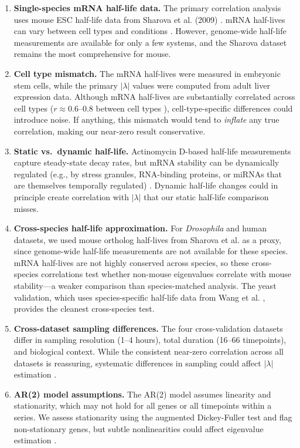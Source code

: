 \documentclass[11pt,letterpaper]{article}
\begin{document}
\begin{enumerate}
\item \textbf{Single-species mRNA half-life data.} The primary correlation analysis uses mouse ESC half-life data from Sharova et al. (2009) \citep{sharova2009database}. mRNA half-lives can vary between cell types and conditions \citep{schwanhausser2011global, tani2012identification}. However, genome-wide half-life measurements are available for only a few systems, and the Sharova dataset remains the most comprehensive for mouse.

\item \textbf{Cell type mismatch.} The mRNA half-lives were measured in embryonic stem cells, while the primary $|\lambda|$ values were computed from adult liver expression data. Although mRNA half-lives are substantially correlated across cell types ($r \approx 0.6$--$0.8$ between cell types \citep{schwanhausser2011global}), cell-type-specific differences could introduce noise. If anything, this mismatch would tend to \textit{inflate} any true correlation, making our near-zero result conservative.

\item \textbf{Static vs.\ dynamic half-life.} Actinomycin D-based half-life measurements capture steady-state decay rates, but mRNA stability can be dynamically regulated (e.g., by stress granules, RNA-binding proteins, or miRNAs that are themselves temporally regulated) \citep{anderson2009stress, keene2007rna}. Dynamic half-life changes could in principle create correlation with $|\lambda|$ that our static half-life comparison misses.

\item \textbf{Cross-species half-life approximation.} For \textit{Drosophila} and human datasets, we used mouse ortholog half-lives from Sharova et al. as a proxy, since genome-wide half-life measurements are not available for these species. mRNA half-lives are not highly conserved across species, so these cross-species correlations test whether non-mouse eigenvalues correlate with mouse stability---a weaker comparison than species-matched analysis. The yeast validation, which uses species-specific half-life data from Wang et al. \citep{wang2002precision}, provides the cleanest cross-species test.

\item \textbf{Cross-dataset sampling differences.} The four cross-validation datasets differ in sampling resolution (1--4 hours), total duration (16--66 timepoints), and biological context. While the consistent near-zero correlation across all datasets is reassuring, systematic differences in sampling could affect $|\lambda|$ estimation \citep{box2015time}.

\item \textbf{AR(2) model assumptions.} The AR(2) model assumes linearity and stationarity, which may not hold for all genes or all timepoints within a series. We assess stationarity using the augmented Dickey-Fuller test and flag non-stationary genes, but subtle nonlinearities could affect eigenvalue estimation \citep{hamilton1994time}.
\end{enumerate}
\end{document}
